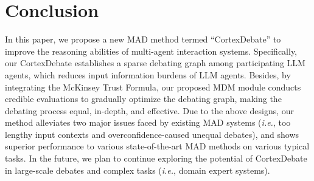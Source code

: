\section{Conclusion}

In this paper, we propose a new MAD method termed ``CortexDebate'' to improve the reasoning abilities of multi-agent interaction systems. Specifically, our CortexDebate establishes a sparse debating graph among participating LLM agents, which reduces input information burdens of LLM agents. Besides, by integrating the McKinsey Trust Formula, our proposed MDM module conducts credible evaluations to gradually optimize the debating graph, making the debating process equal, in-depth, and effective. Due to the above designs, our method alleviates two major issues faced by existing MAD systems (\textit{i.e.}, too lengthy input contexts and overconfidence-caused unequal debates), and shows superior performance to various state-of-the-art MAD methods on various typical tasks. In the future, we plan to continue exploring the potential of CortexDebate in large-scale debates and complex tasks (\textit{i.e.}, domain expert systems).